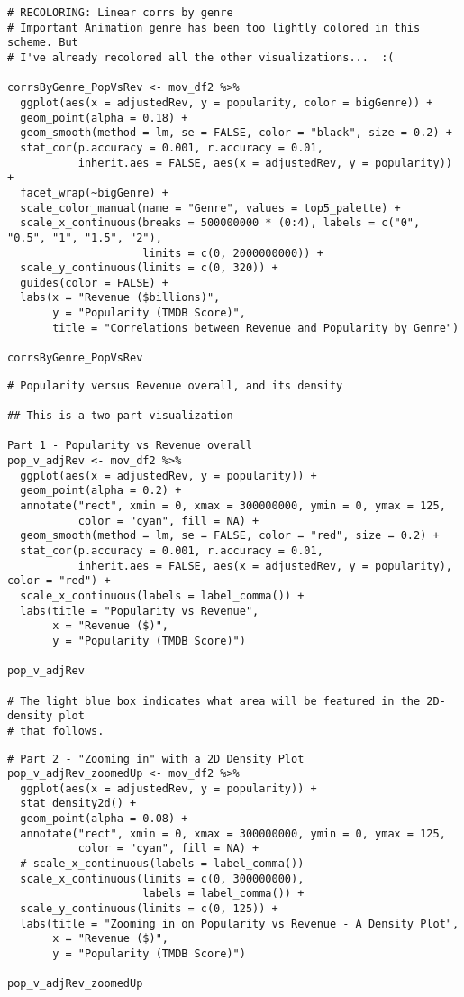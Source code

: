 \begin{lstlisting}
# RECOLORING: Linear corrs by genre
# Important Animation genre has been too lightly colored in this scheme. But 
# I've already recolored all the other visualizations...  :(

corrsByGenre_PopVsRev <- mov_df2 %>%
  ggplot(aes(x = adjustedRev, y = popularity, color = bigGenre)) +
  geom_point(alpha = 0.18) +
  geom_smooth(method = lm, se = FALSE, color = "black", size = 0.2) +
  stat_cor(p.accuracy = 0.001, r.accuracy = 0.01,
           inherit.aes = FALSE, aes(x = adjustedRev, y = popularity)) +
  facet_wrap(~bigGenre) +
  scale_color_manual(name = "Genre", values = top5_palette) +
  scale_x_continuous(breaks = 500000000 * (0:4), labels = c("0", "0.5", "1", "1.5", "2"),
                     limits = c(0, 2000000000)) +
  scale_y_continuous(limits = c(0, 320)) +
  guides(color = FALSE) +
  labs(x = "Revenue ($billions)",
       y = "Popularity (TMDB Score)",
       title = "Correlations between Revenue and Popularity by Genre")

corrsByGenre_PopVsRev
\end{lstlisting}

\begin{lstlisting}
# Popularity versus Revenue overall, and its density

## This is a two-part visualization

Part 1 - Popularity vs Revenue overall
pop_v_adjRev <- mov_df2 %>%
  ggplot(aes(x = adjustedRev, y = popularity)) +
  geom_point(alpha = 0.2) +
  annotate("rect", xmin = 0, xmax = 300000000, ymin = 0, ymax = 125,
           color = "cyan", fill = NA) +
  geom_smooth(method = lm, se = FALSE, color = "red", size = 0.2) +
  stat_cor(p.accuracy = 0.001, r.accuracy = 0.01,
           inherit.aes = FALSE, aes(x = adjustedRev, y = popularity), color = "red") +
  scale_x_continuous(labels = label_comma()) + 
  labs(title = "Popularity vs Revenue",
       x = "Revenue ($)",
       y = "Popularity (TMDB Score)")

pop_v_adjRev

# The light blue box indicates what area will be featured in the 2D-density plot
# that follows.
\end{lstlisting}

\begin{lstlisting}
# Part 2 - "Zooming in" with a 2D Density Plot
pop_v_adjRev_zoomedUp <- mov_df2 %>%
  ggplot(aes(x = adjustedRev, y = popularity)) +
  stat_density2d() +
  geom_point(alpha = 0.08) +
  annotate("rect", xmin = 0, xmax = 300000000, ymin = 0, ymax = 125,
           color = "cyan", fill = NA) +
  # scale_x_continuous(labels = label_comma())
  scale_x_continuous(limits = c(0, 300000000),
                     labels = label_comma()) +
  scale_y_continuous(limits = c(0, 125)) + 
  labs(title = "Zooming in on Popularity vs Revenue - A Density Plot",
       x = "Revenue ($)",
       y = "Popularity (TMDB Score)")

pop_v_adjRev_zoomedUp
\end{lstlisting}

